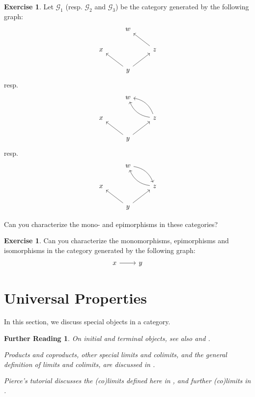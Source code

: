 \documentclass[a4paper,10pt]{scrartcl}
\theoremstyle{plain}
\newtheorem*{reading*}{Further Reading}
\theoremstyle{definition}
\newtheorem{exer}[thm]{Exercise}
\begin{document}
\begin{exer} Let $\mathcal{G}_1$ (resp. $\mathcal{G}_2$ and $\mathcal{G}_3$) be the category generated by the following graph:
\[
\begin{tikzcd}
& w & \\
x & & z \arrow[lu] \\
& y \arrow[lu] \arrow[ru] &
\end{tikzcd}
\]
resp.
\[
\begin{tikzcd}
& w & \\
x & & z \arrow[lu, bend left] \arrow[lu,bend right] \\
& y \arrow[lu] \arrow[ru] &
\end{tikzcd}
\]
resp.
\[
\begin{tikzcd}
& w \arrow[rd,bend left] & \\
x & & z \arrow[lu, bend left] \\
& y \arrow[lu] \arrow[ru] &
\end{tikzcd}
\]

Can you characterize the mono- and epimorphisms in these categories?
\end{exer}

\begin{exer} Can you characterize the monomorphisms, epimorphisms and isomorphisms in the category generated by the following graph:
\[
\begin{tikzcd}
x \arrow[r] & y
\end{tikzcd}
\]
\end{exer}

\section{Universal Properties}\label{sec:universal}

In this section, we discuss special objects in a category. 

\begin{reading*}
  On initial and terminal objects, see also \cite[\S 2.7.16]{barr-wells} and \cite[p. 48ff]{leinster}.

  Products and coproducts, other special limits and colimits, and the general definition of limits and colimits, are discussed in \cite[\S\S 5.1, 5.2]{leinster}.

  Pierce's tutorial discusses the (co)limits defined here in \cite[\S\S 2.3--2.4]{pierce}, and further (co)limits in  \cite[\S\S 2.5--2.7]{pierce}.

  
\end{reading*}
\end{document}

